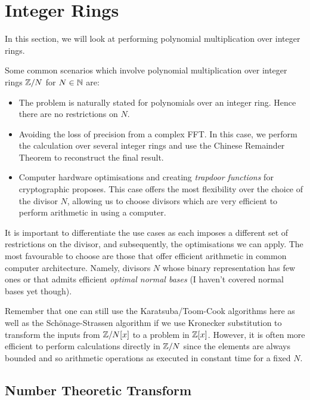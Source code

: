 \chapter{Integer Rings}\label{chp:finite}

In this section, we will look at performing polynomial multiplication over integer rings.

Some common scenarios which involve polynomial multiplication over integer rings ${\mathbb Z}/N$ for $N \in {\mathbb N}$ are:
\begin{itemize}
    \item The problem is naturally stated for polynomials over an integer ring. Hence there are no restrictions on $N$.
    \item Avoiding the loss of precision from a complex FFT. In this case, we perform the calculation over several integer rings and use the Chinese Remainder Theorem to reconstruct the final result.
    \item Computer hardware optimisations and creating \emph{trapdoor functions} for cryptographic proposes. This case offers the most flexibility over the choice of the divisor $N$, allowing us to choose divisors which are very efficient to perform arithmetic in using a computer.
\end{itemize}

It is important to differentiate the use cases as each imposes a different set of restrictions on the divisor, and subsequently, the optimisations we can apply. The most favourable to choose are those that offer efficient arithmetic in common computer architecture. Namely, divisors $N$ whose binary representation has few ones or that admits efficient \emph{optimal normal bases} (I haven't covered normal bases yet though).

Remember that one can still use the Karatsuba/Toom-Cook algorithms here as well as the Sch\"{o}nage-Strassen algorithm if we use Kronecker substitution to transform the inputs from ${\mathbb Z}/N[x]$ to a problem in ${\mathbb Z}[x]$. However, it is often more efficient to perform calculations directly in ${\mathbb Z}/N$ since the elements are always bounded and so arithmetic operations as executed in constant time for a fixed $N$.


\section{Number Theoretic Transform}
\label{sec:ntt}

